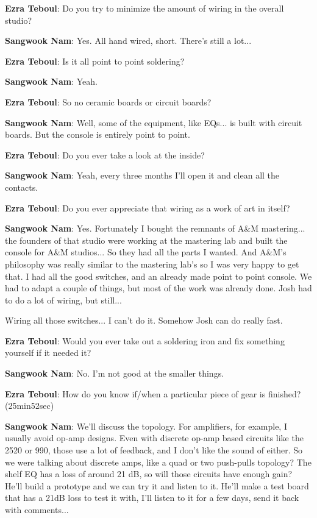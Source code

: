 \textbf{Ezra Teboul}: Do you try to minimize the amount of wiring in the overall studio?

\textbf{Sangwook Nam}: Yes. All hand wired, short. There's still a lot...

\textbf{Ezra Teboul}: Is it all point to point soldering?

\textbf{Sangwook Nam}: Yeah.

\textbf{Ezra Teboul}: So no ceramic boards or circuit boards?

\textbf{Sangwook Nam}: Well, some of the equipment, like EQs... is built with circuit boards. But the console is entirely point to point.

\textbf{Ezra Teboul}: Do you ever take a look at the inside?

\textbf{Sangwook Nam}: Yeah, every three months I'll open it and clean all the contacts.

\textbf{Ezra Teboul}: Do you ever appreciate that wiring as a work of art in itself?

\textbf{Sangwook Nam}: Yes. Fortunately I bought the remnants of A\&M mastering... the founders of that studio were working at the mastering lab and built the console for A\&M studios... So they had all the parts I wanted. And A\&M's philosophy was really similar to the mastering lab's so I was very happy to get that. I had all the good switches, and an already made point to point console. We had to adapt a couple of things, but most of the work was already done. Josh had to do a lot of wiring, but still...

Wiring all those switches... I can't do it. Somehow Josh can do really fast.

\textbf{Ezra Teboul}: Would you ever take out a soldering iron and fix something yourself if it needed it?

\textbf{Sangwook Nam}: No. I'm not good at the smaller things.

\textbf{Ezra Teboul}: How do you know if/when a particular piece of gear is finished? (25min52sec)

\textbf{Sangwook Nam}: We'll discuss the topology. For amplifiers, for example, I usually avoid op-amp designs. Even with discrete op-amp based circuits like the 2520 or 990, those use a lot of feedback, and I don't like the sound of either. So we were talking about discrete amps, like a quad or two push-pulls topology? The shelf EQ has a loss of around 21 dB, so will those circuits have enough gain? He'll build a prototype and we can try it and listen to it. He'll make a test board that has a 21dB loss to test it with, I'll listen to it for a few days, send it back with comments...

